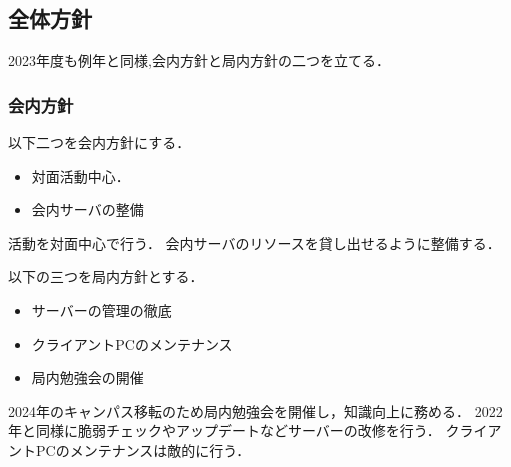 \subsection*{全体方針}


2023年度も例年と同様,会内方針と局内方針の二つを立てる．

\subsubsection*{会内方針}
以下二つを会内方針にする．
\begin{itemize}
    \item 対面活動中心．
    \item 会内サーバの整備
\end{itemize}
活動を対面中心で行う．
会内サーバのリソースを貸し出せるように整備する．

以下の三つを局内方針とする．
\begin{itemize}
    \item サーバーの管理の徹底
    \item クライアントPCのメンテナンス
    \item 局内勉強会の開催
\end{itemize}
2024年のキャンパス移転のため局内勉強会を開催し，知識向上に務める．
2022年と同様に脆弱チェックやアップデートなどサーバーの改修を行う．
クライアントPCのメンテナンスは敵的に行う．    